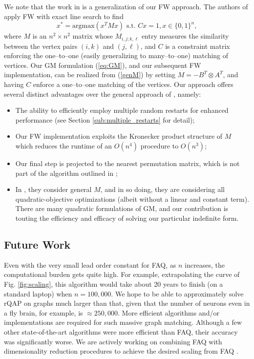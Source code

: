 \documentclass[10pt]{article}
\begin{document}
We note that the work in \cite{otherFW} is a generalization of our FW approach.  The authors of \cite{otherFW} apply FW with exact line search to find
\begin{equation}
\label{genM}
x^* = \text{argmax}(x
^TMx) \text{ s.t. } Cx = 1, x \in \{0, 1\}^
n,
\end{equation}
where $M$ is an $n^2\times n^2$ matrix whose $M_{i,j;k,\ell}$ entry measures the similarity between the vertex pairs $(i, k)$ and $(j, \ell)$, and $C$ is a constraint matrix enforcing the one--to--one (easily generalizing to many--to--one) matching of vertices.  Our GM formulation (\ref{eq:GM}), and our subsequent FW implementation, can be realized from (\ref{genM}) by setting $M=-B^T\otimes A^T$, and having $C$ enforce a one--to--one matching of the vertices.
Our approach offers several distinct advantages over the general approach of \cite{otherFW}, namely:
\begin{itemize}
\item  The ability to efficiently employ multiple random restarts for enhanced performance (see Section \ref{sub:multiple_restarts} for detail);
\item  Our FW implementation exploits the Kronecker product structure of $M$ which
reduces the runtime of an $O(n^4)$ procedure to $O(n^3)$;
\item  Our final step is projected to the nearest permutation matrix, which is not  part of the algorithm outlined in \cite{otherFW};
\item In \cite{otherFW}, they consider general $M$, and in so doing, they are considering all quadratic-objective optimizations (albeit without a linear and constant term).  There are many quadratic formulations of GM, and our contribution is touting the efficiency and efficacy of solving our particular indefinite form.
\end{itemize}



\subsection{Future Work}

Even with the very small lead order constant for FAQ, as $n$ increases, the computational burden gets quite high.  For example, extrapolating the curve of Fig. \ref{fig:scaling}, this algorithm would take about 20 years to finish (on a standard laptop) when $n=100,000$.  We hope to be able to approximately solve rQAP on graphs much larger than that, given that the number of neurons even in a fly brain, for example, is $\approx 250,000$.  More efficient algorithms and/or implementations are required for such massive graph matching. Although a few other state-of-the-art algorithms were more efficient than FAQ, their accuracy was significantly worse.  We are actively working on combining FAQ with dimensionality reduction procedures to achieve the desired scaling from FAQ \cite{Lyzinski2013}.
\end{document}
